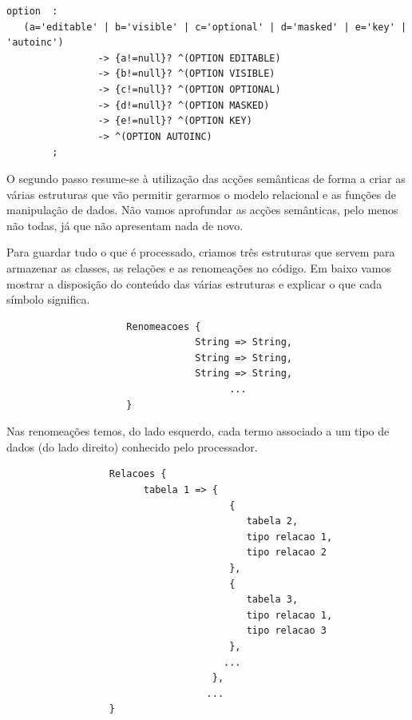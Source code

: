 \documentclass[a4paper]{article}
\begin{document}
\begin{small}
\begin{lstlisting}
option  :
   (a='editable' | b='visible' | c='optional' | d='masked' | e='key' | 'autoinc')
                -> {a!=null}? ^(OPTION EDITABLE)
                -> {b!=null}? ^(OPTION VISIBLE)
                -> {c!=null}? ^(OPTION OPTIONAL)
                -> {d!=null}? ^(OPTION MASKED)
                -> {e!=null}? ^(OPTION KEY)
                -> ^(OPTION AUTOINC)
        ;
\end{lstlisting}
\end{small}

\vspace{0.75cm}
\hspace{1cm}O segundo passo resume-se à utilização das acções semânticas de forma a criar as várias estruturas que vão permitir gerarmos o modelo relacional e as funções de manipulação de dados. Não vamos aprofundar as acções semânticas, pelo menos não todas, já que não apresentam nada de novo.

\hspace{1cm}Para guardar tudo o que é processado, criamos três estruturas que servem para armazenar as classes, as relações e as renomeações no código. Em baixo vamos mostrar a disposição do conteúdo das várias estruturas e explicar o que cada símbolo significa.

\begin{small}
\begin{lstlisting}
                     Renomeacoes {
                                 String => String,
                                 String => String,
                                 String => String,
                                       ...
                     }
\end{lstlisting}
\end{small}

\hspace{1cm}Nas renomeações temos, do lado esquerdo, cada termo associado a um tipo de dados (do lado direito) conhecido pelo processador.\\

\begin{small}
\begin{lstlisting}
                  Relacoes {
                        tabela 1 => {
                                       {
                                          tabela 2,
                                          tipo relacao 1,
                                          tipo relacao 2
                                       },
                                       {
                                          tabela 3,
                                          tipo relacao 1,
                                          tipo relacao 3
                                       },
                                      ...
                                    },
                                   ...
                  }
\end{lstlisting}
\end{small}
\end{document}
